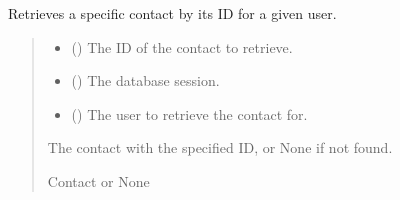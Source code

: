 \documentclass[letterpaper,10pt,english]{sphinxmanual}
\begin{document}
\begin{fulllineitems}
\label{\detokenize{index:src.repository.contacts.get_contact}}
\pysigstartsignatures
{}
\pysigstopsignatures
\sphinxAtStartPar
Retrieves a specific contact by its ID for a given user.
\begin{quote}\begin{description}
\begin{itemize}
\item {} 
\sphinxAtStartPar
{} () \textendash{} The ID of the contact to retrieve.

\item {} 
\sphinxAtStartPar
{} () \textendash{} The database session.

\item {} 
\sphinxAtStartPar
{} () \textendash{} The user to retrieve the contact for.

\end{itemize}

\sphinxAtStartPar
The contact with the specified ID, or None if not found.

\sphinxAtStartPar
Contact or None

\end{description}\end{quote}

\end{fulllineitems}

\end{document}
